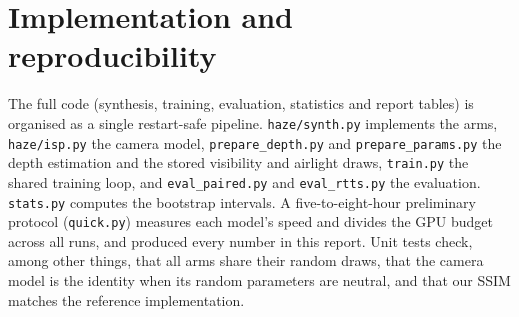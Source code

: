 \documentclass{article}
\begin{document}
\section{Implementation and reproducibility}
The full code (synthesis, training, evaluation, statistics and report tables) is organised as a single restart-safe pipeline. \texttt{haze/synth.py} implements the arms, \texttt{haze/isp.py} the camera model, \texttt{prepare\_depth.py} and \texttt{prepare\_params.py} the depth estimation and the stored visibility and airlight draws, \texttt{train.py} the shared training loop, and \texttt{eval\_paired.py} and \texttt{eval\_rtts.py} the evaluation. \texttt{stats.py} computes the bootstrap intervals. A five-to-eight-hour preliminary protocol (\texttt{quick.py}) measures each model's speed and divides the GPU budget across all runs, and produced every number in this report. Unit tests check, among other things, that all arms share their random draws, that the camera model is the identity when its random parameters are neutral, and that our SSIM matches the reference implementation.
\end{document}
